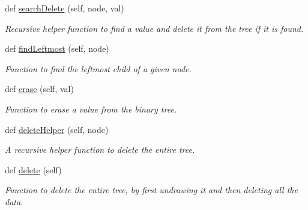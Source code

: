 \begin{DoxyCompactItemize}
def \hyperlink{class_binary_search_tree_1_1_binary_search_tree_a71d2af564255a83b5d11ed57d099c945}{search\+Delete} (self, node, val)
\begin{DoxyCompactList}\small\item\em Recursive helper function to find a value and delete it from the tree if it is found. \end{DoxyCompactList}\item 
def \hyperlink{class_binary_search_tree_1_1_binary_search_tree_a27ef9920f4c1e30e4d27cc4191d763f5}{find\+Leftmost} (self, node)
\begin{DoxyCompactList}\small\item\em Function to find the leftmost child of a given node. \end{DoxyCompactList}\item 
def \hyperlink{class_binary_search_tree_1_1_binary_search_tree_ada4129c8eb622c9180596f7df720f4db}{erase} (self, val)
\begin{DoxyCompactList}\small\item\em Function to erase a value from the binary tree. \end{DoxyCompactList}\item 
def \hyperlink{class_binary_search_tree_1_1_binary_search_tree_a443c7f4b6e51d0bd1e73e57764598c25}{delete\+Helper} (self, node)
\begin{DoxyCompactList}\small\item\em A recursive helper function to delete the entire tree. \end{DoxyCompactList}\item 
def \hyperlink{class_binary_search_tree_1_1_binary_search_tree_a50511b83542efd335c333228ec3a0da0}{delete} (self)
\begin{DoxyCompactList}\small\item\em Function to delete the entire tree, by first undrawing it and then deleting all the data. \end{DoxyCompactList}\end{DoxyCompactItemize}
